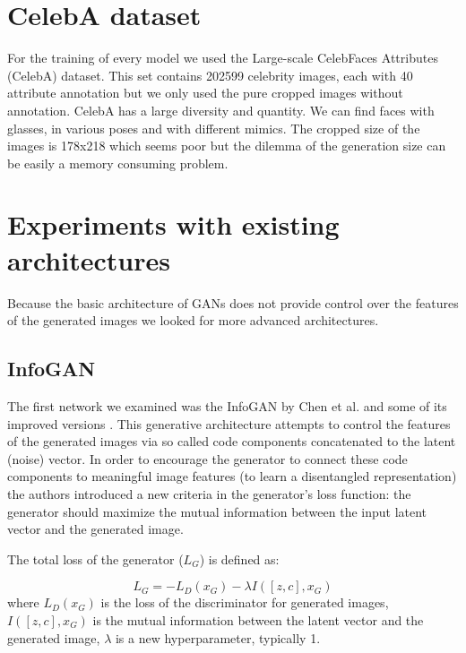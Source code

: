 \documentclass[10pt,journal,compsoc]{IEEEtran}
\begin{document}
\section{CelebA dataset}

For the training of every model we used the Large-scale CelebFaces Attributes (CelebA) dataset. This set contains 202599 celebrity images, each with 40 attribute annotation but we only used the pure cropped images without annotation. CelebA has a large diversity and quantity. We can find faces with glasses, in various poses and with different mimics. The cropped size of the images is 178x218 which seems poor but the dilemma of the generation size can be easily a memory consuming problem.

\section{Experiments with existing architectures}

Because the basic architecture of GANs does not provide control over the features of the generated images we looked for more advanced architectures.

\subsection{InfoGAN}

The first network we examined was the InfoGAN by Chen et al. \cite{chen2016infogan} and some of its improved versions \cite{10.1007/978-3-319-78452-6_5}\cite{mirza2014conditional}. This generative architecture attempts to control the features of the generated images via so called code components concatenated to the latent (noise) vector. In order to encourage the generator to connect these code components to meaningful image features (to learn a disentangled representation) the authors introduced a new criteria in the generator's loss function: the generator should maximize the mutual information between the input latent vector and the generated image.

The total loss of the generator ($L_G$) is defined as:

\begin{equation}\label{g_loss}
	L_G = -L_D(x_G) - \lambda I([z,c], x_G)
\end{equation}
where $L_D(x_G)$ is the loss of the discriminator for generated images, $I([z,c], x_G)$ is the mutual information between the latent vector and the generated image, $\lambda$ is a new hyperparameter, typically 1.
\end{document}
